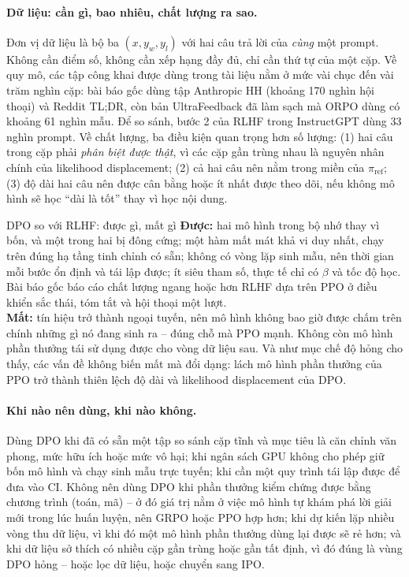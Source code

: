 \paragraph{Dữ liệu: cần gì, bao nhiêu, chất lượng ra sao.}
Đơn vị dữ liệu là bộ ba \( (x, y_w, y_l) \) với hai câu trả lời của \emph{cùng} một prompt. Không cần điểm số, không cần xếp hạng đầy đủ, chỉ cần thứ tự của một cặp. Về quy mô, các tập công khai được dùng trong tài liệu nằm ở mức vài chục đến vài trăm nghìn cặp: bài báo gốc dùng tập Anthropic HH (khoảng 170 nghìn hội thoại) và Reddit TL;DR, còn bản UltraFeedback đã làm sạch mà ORPO dùng có khoảng 61 nghìn mẫu. Để so sánh, bước 2 của RLHF trong InstructGPT dùng 33 nghìn prompt. Về chất lượng, ba điều kiện quan trọng hơn số lượng: (1) hai câu trong cặp phải \emph{phân biệt được thật}, vì các cặp gần trùng nhau là nguyên nhân chính của likelihood displacement; (2) cả hai câu nên nằm trong miền của \( \pi_{\text{ref}} \); (3) độ dài hai câu nên được cân bằng hoặc ít nhất được theo dõi, nếu không mô hình sẽ học ``dài là tốt'' thay vì học nội dung.

\begin{assess}{DPO so với RLHF: được gì, mất gì}
\textbf{Được:} hai mô hình trong bộ nhớ thay vì bốn, và một trong hai bị đông cứng; một hàm mất mát khả vi duy nhất, chạy trên đúng hạ tầng tinh chỉnh có sẵn; không có vòng lặp sinh mẫu, nên thời gian mỗi bước ổn định và tái lập được; ít siêu tham số, thực tế chỉ có \( \beta \) và tốc độ học. Bài báo gốc báo cáo chất lượng ngang hoặc hơn RLHF dựa trên PPO ở điều khiển sắc thái, tóm tắt và hội thoại một lượt.\\[4pt]
\textbf{Mất:} tín hiệu trở thành ngoại tuyến, nên mô hình không bao giờ được chấm trên chính những gì nó đang sinh ra -- đúng chỗ mà PPO mạnh. Không còn mô hình phần thưởng tái sử dụng được cho vòng dữ liệu sau. Và như mục chế độ hỏng cho thấy, các vấn đề không biến mất mà đổi dạng: lách mô hình phần thưởng của PPO trở thành thiên lệch độ dài và likelihood displacement của DPO.
\end{assess}

\paragraph{Khi nào nên dùng, khi nào không.}
Dùng DPO khi đã có sẵn một tập so sánh cặp tĩnh và mục tiêu là căn chỉnh văn phong, mức hữu ích hoặc mức vô hại; khi ngân sách GPU không cho phép giữ bốn mô hình và chạy sinh mẫu trực tuyến; khi cần một quy trình tái lập được để đưa vào CI. Không nên dùng DPO khi phần thưởng kiểm chứng được bằng chương trình (toán, mã) -- ở đó giá trị nằm ở việc mô hình tự khám phá lời giải mới trong lúc huấn luyện, nên GRPO hoặc PPO hợp hơn; khi dự kiến lặp nhiều vòng thu dữ liệu, vì khi đó một mô hình phần thưởng dùng lại được sẽ rẻ hơn; và khi dữ liệu sở thích có nhiều cặp gần trùng hoặc gần tất định, vì đó đúng là vùng DPO hỏng -- hoặc lọc dữ liệu, hoặc chuyển sang IPO.

